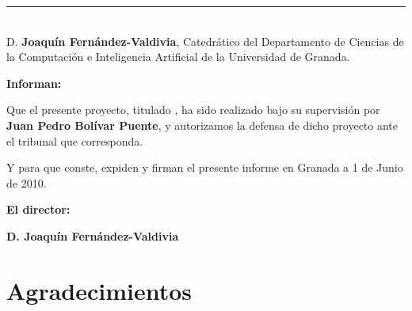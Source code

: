 \cleardoublepage
\thispagestyle{empty}
\noindent\rule[-1ex]{\textwidth}{2pt}\\[4.5ex]
D. \textbf{Joaquín Fernández-Valdivia}, Catedrático del Departamento
de Ciencias de la Computación e Inteligencia Artificial de la
Universidad de Granada.  \vspace{0.5cm}


\textbf{Informan:}
\vspace{0.5cm}

Que el presente proyecto, titulado \textit{\textbf{\myTitle}}, ha sido
realizado bajo su supervisión por \textbf{Juan Pedro Bolívar Puente}, y
autorizamos la defensa de dicho proyecto ante el tribunal que
corresponda.
\vspace{0.5cm}

Y para que conste, expiden y firman el presente informe en Granada a 1
de Junio de 2010.
\vspace{1cm}

\textbf{El director:}
\vspace{5cm}

\noindent 
\textbf{D. Joaquín Fernández-Valdivia}%

\chapter*{Agradecimientos}
\thispagestyle{empty}
\vspace{1cm}


\vspace{3cm}

